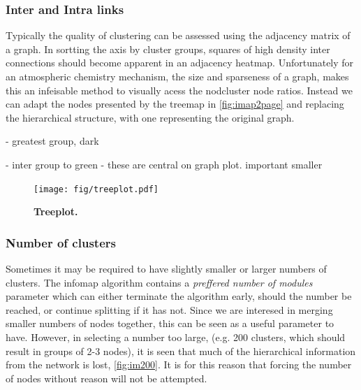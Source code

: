 
\subsubsection{Inter and Intra links}
 Typically the quality of clustering can be assessed using the adjacency matrix of a graph. In sortting the axis by cluster groups, squares of high density inter connections should become apparent in an adjacency heatmap. Unfortunately for an atmospheric chemistry mechanism, the size and sparseness of a graph, makes this an infeisable method to visually acess the nodcluster node ratios. Instead we can adapt the nodes presented by the treemap in \autoref{fig:imap2page} and replacing the hierarchical structure, with one representing the original graph. 

-  greatest group, dark

- inter group to green - these are central on graph plot. important smaller
 
 
   \begin{figure}[H]
     \centering
     \texttt{[image: fig/treeplot.pdf]}
     \caption{\textbf{Treeplot.} }
         \label{fig:imtreeplot}
   \end{figure}



 

 \subsubsection{Number of clusters}
Sometimes it may be required to have slightly smaller or larger numbers of clusters. The infomap algorithm contains a \emph{preffered number of modules} parameter which can either terminate the algorithm early, should the number be reached, or continue splitting if it has not. Since we are interesed in merging smaller numbers of nodes together, this can be seen as a useful parameter to have. However, in selecting a number too large, (e.g. 200 clusters, which should result in groups of 2-3 nodes), it is seen that much of the hierarchical information from the network is lost, \autoref{fig:im200}. It is for this reason that forcing the number of nodes without reason will not be attempted. 


